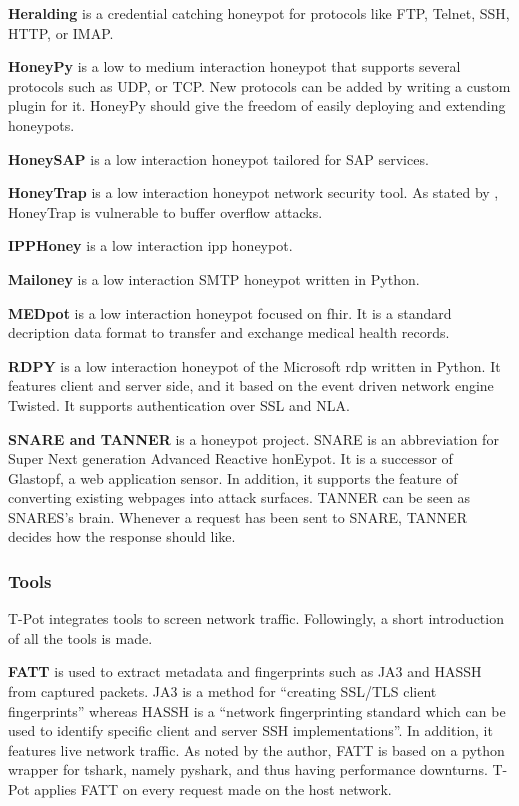 \textbf{Heralding} \cite{heralding2021} is a credential catching honeypot for protocols like FTP, Telnet, SSH, HTTP, or IMAP.

\textbf{HoneyPy} \cite{honeysap2021} is a low to medium interaction honeypot that supports several protocols such as UDP, or TCP.
New protocols can be added by writing a custom plugin for it.
HoneyPy should give the freedom of easily deploying and extending honeypots.

\textbf{HoneySAP} \cite{honeysap2021} is a low interaction honeypot tailored for SAP services.

\textbf{HoneyTrap} \cite{honeytrap2021} is a low interaction honeypot network security tool.
As stated by \citet*{honeytrap2021}, HoneyTrap is vulnerable to buffer overflow attacks.

\textbf{IPPHoney} \cite{ipphoney2021} is a low interaction \ac{ipp} honeypot.

\textbf{Mailoney} is a low interaction SMTP honeypot written in Python.

\textbf{MEDpot} \cite{medpot2021} is a low interaction honeypot focused on \ac{fhir}.
It is a standard decription data format to transfer and exchange medical health records.

\textbf{RDPY} \cite{rdpy2021} is a low interaction honeypot of the Microsoft \ac{rdp} written in Python.
It features client and server side, and it based on the event driven network engine Twisted.
It supports authentication over SSL and NLA.

\textbf{SNARE and TANNER} \cite{snare2021, tanner2021} is a honeypot project.
SNARE is an abbreviation for Super Next generation Advanced Reactive honEypot.
It is a successor of Glastopf, a web application sensor.
In addition, it supports the feature of converting existing webpages into attack surfaces.
TANNER \cite{tanner2021} can be seen as SNARES's brain.
Whenever a request has been sent to SNARE, TANNER decides how the response should like.

\subsubsection{Tools}

T-Pot integrates tools to screen network traffic. Followingly, a short introduction of all the tools is made.

\textbf{FATT} \cite{fatt2021} is used to extract metadata and fingerprints such as JA3 \cite{ja32021} and HASSH \cite{hassh2021} from captured packets.
JA3 is a method for \enquote{creating SSL/TLS client fingerprints} whereas HASSH is a \enquote{network fingerprinting standard which can be used to identify specific client and server SSH implementations}.
In addition, it features live network traffic.
As noted by the author, FATT is based on a python wrapper for tshark, namely pyshark, and thus having performance downturns.
T-Pot applies FATT on every request made on the host network.

